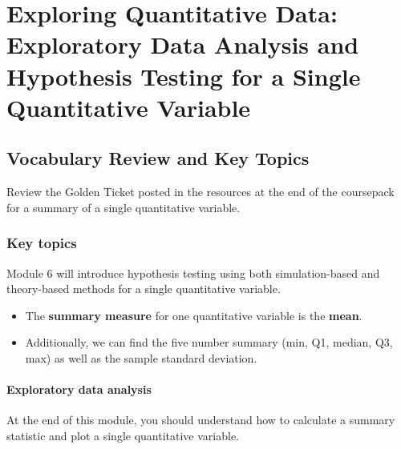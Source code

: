\documentclass[
]{report}
\begin{document}
\nocite{*}

\chapter{Exploring Quantitative Data: Exploratory Data Analysis and Hypothesis Testing for a Single Quantitative Variable}\label{exploring-quantitative-data-exploratory-data-analysis-and-hypothesis-testing-for-a-single-quantitative-variable}

\section{Vocabulary Review and Key Topics}\label{vocabulary-review-and-key-topics}

Review the Golden Ticket posted in the resources at the end of the coursepack for a summary of a single quantitative variable.

\subsection{Key topics}\label{key-topics}

Module 6 will introduce hypothesis testing using both simulation-based and theory-based methods for a single quantitative variable.

\begin{itemize}
\item
  The \textbf{summary measure} for one quantitative variable is the \textbf{mean}.
\item
  Additionally, we can find the five number summary (min, Q1, median, Q3, max) as well as the sample standard deviation.
\end{itemize}

\subsubsection*{Exploratory data analysis}\label{exploratory-data-analysis}

At the end of this module, you should understand how to calculate a summary statistic and plot a single quantitative variable.
\end{document}
